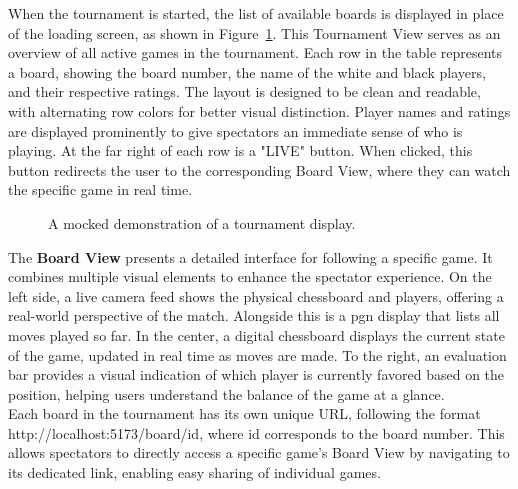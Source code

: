 When the tournament is started, the list of available boards is displayed in place of the loading screen, as shown in Figure~\ref{fig:tournament-view-mocked}. This Tournament View serves as an overview of all active games in the tournament. Each row in the table represents a board, showing the board number, the name of the white and black players, and their respective ratings. The layout is designed to be clean and readable, with alternating row colors for better visual distinction. Player names and ratings are displayed prominently to give spectators an immediate sense of who is playing. At the far right of each row is a "LIVE" button. When clicked, this button redirects the user to the corresponding Board View, where they can watch the specific game in real time. \\

\begin{figure}[h!] \centering {}\caption[Display over tournament]{A mocked demonstration of a tournament display.}\label{fig:tournament-view-mocked} \end{figure}

The \textbf{Board View} presents a detailed interface for following a specific game. It combines multiple visual elements to enhance the spectator experience. On the left side, a live camera feed shows the physical chessboard and players, offering a real-world perspective of the match. Alongside this is a \gls{pgn} display that lists all moves played so far. In the center, a digital chessboard displays the current state of the game, updated in real time as moves are made. To the right, an evaluation bar provides a visual indication of which player is currently favored based on the position, helping users understand the balance of the game at a glance. \\

Each board in the tournament has its own unique URL, following the format http://localhost:5173/board/{id}, where {id} corresponds to the board number. This allows spectators to directly access a specific game's Board View by navigating to its dedicated link, enabling easy sharing of individual games. \\

